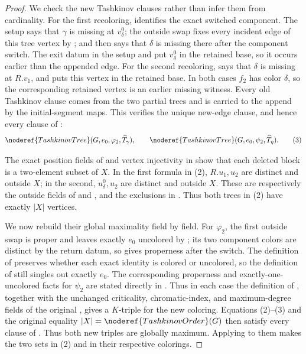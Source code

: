 \begin{proof}
We check the new Tashkinov clauses rather than infer them from
cardinality.  For the first recoloring,
 identifies the exact switched
component.  The setup  says that $\gamma$
is missing at $v^0_\delta$; the outside swap fixes every incident edge of
this tree vertex by ; and
 then says that $\delta$ is
missing there after the component switch.  The exit datum in the setup and
 put $v^0_\delta$ in the retained
base, so it occurs earlier than the appended edge.  For the second
recoloring,
 says that $\delta$ is
missing at $R.v_1$, and  puts this
vertex in the retained base.  In both cases $f_2$ has color $\delta$, so
the corresponding retained vertex is an earlier missing witness.  Every
old Tashkinov clause comes from the two partial trees and is carried to the
append by the initial-segment maps.  This verifies the unique new-edge
clause, and hence every clause of :
\[
 \noderef{TashkinovTree}(G,e_0,\varphi_2,\widehat T_\gamma),
 \qquad
 \noderef{TashkinovTree}(G,e_0,\psi_2,\widehat T_\eta).       \tag{3}
\]

The exact position fields of 
and vertex injectivity in  show that each deleted
block is a two-element subset of $X$.  In the first formula in (2),
$R.u_1,u_2$ are distinct and outside $X$; in the second,
$u^0_\delta,u_2$ are distinct and outside $X$.  These are respectively
the outside fields of  and
, and the exclusions in
.  Thus both trees in (2) have
exactly $|X|$ vertices.

We now rebuild their global maximality field by field.  For $\varphi_2$,
the first outside swap is proper and leaves exactly $e_0$ uncolored by
; its two component colors are
distinct by the return datum, so
 gives properness after the switch.
The definition of  preserves whether each
exact identity is colored or uncolored, so the definition of
 still singles out exactly $e_0$.  The
corresponding properness and exactly-one-uncolored facts for $\psi_2$ are
stated directly in .
Thus in each case the definition of
, together with the unchanged criticality,
chromatic-index, and maximum-degree fields of the original
, gives a $K$-triple for the new coloring.
Equations (2)--(3) and the original equality
$|X|=\noderef{TashkinovOrder}(G)$ then satisfy every clause of
.  Thus both new triples are globally
maximum.  Applying  to them makes
the two sets in (2)  and
 in their respective colorings.


\end{proof}
